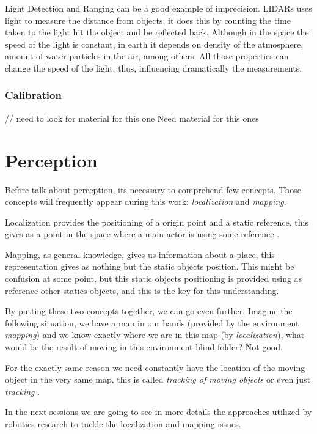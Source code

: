 Light Detection and Ranging can be a good example of imprecision. LIDARs uses light to measure the distance from objects, it does this by counting the time taken to the light hit the object and be reflected back. Although in the space the speed of the light is constant, in earth it depends on density of the atmosphere, amount of water particles in the air, among others. All those properties can change the speed of the light, thus, influencing dramatically the measurements.

\subsubsection{Calibration} // need to look for material for this one
Need material for this ones

\section{Perception}

Before talk about perception, its necessary to comprehend few concepts. Those concepts will frequently appear during this work: \textit{localization} and \textit{mapping}.

Localization provides the positioning of a origin point and a static reference, this gives as a point in the space where a main actor is using some reference .  

Mapping, as general knowledge, gives us information about a place, this representation gives as nothing but the static objects position. This might be confusion at some point, but this static objects positioning is provided using as reference other statics objects, and this is the key for this understanding.

By putting these two concepts together, we can go even further. Imagine the following situation, we have a map in our hands (provided by the environment \textit{mapping}) and we know exactly where we are in this map (by \textit{localization}), what would be the result of moving in this environment blind folder? Not good.

For the exactly same reason we need constantly have the location of the moving object in the very same map, this is called \textit{tracking of moving objects} or even just \textit{tracking} \cite{Wang04a}.

In the next sessions we are going to see in more details the approaches utilized by robotics research to tackle the localization and mapping issues.

